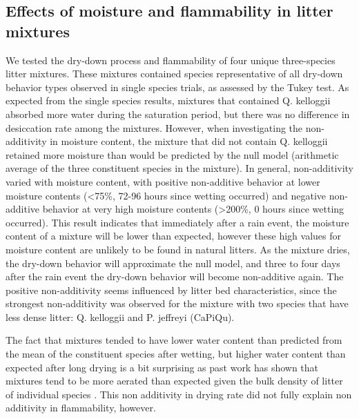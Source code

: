 \documentclass[fire,article,submit,moreauthors,pdftex]{Definitions/mdpi}
\begin{document}
\subsection{Effects of moisture and flammability in litter mixtures}

We tested the dry-down process and flammability of four unique three-species litter mixtures. These mixtures contained species representative of all dry-down behavior types observed in single species trials, as assessed by the Tukey test. As expected from the single species results, mixtures that contained Q. kelloggii absorbed more water during the saturation period, but there was no difference in desiccation rate among the mixtures. However, when investigating the non-additivity in moisture content, the mixture that did not contain Q. kelloggii retained more moisture than would be predicted by the null model (arithmetic average of the three constituent species in the mixture). In general, non-additivity varied with moisture content, with positive non-additive behavior at lower moisture contents (<75\%, 72-96 hours since wetting occurred) and negative non-additive behavior at very high moisture contents (>200\%, 0 hours since wetting occurred). This result indicates that immediately after a rain event, the moisture content of a mixture will be lower than expected, however these high values for moisture content are unlikely to be found in natural litters. As the mixture dries, the dry-down behavior will approximate the null model, and three to four days after the rain event the dry-down behavior will become non-additive again. The positive non-additivity seems influenced by litter bed characteristics, since the strongest non-additivity was observed for the mixture with two species that have less dense litter: Q. kelloggii and P. jeffreyi (CaPiQu).


The fact that mixtures tended to have lower water content than predicted from
the mean of the constituent species after wetting, but higher water content
than expected after long drying is a bit surprising as past work has shown that
mixtures tend to be more aerated than expected given the bulk density of litter
of individual species \citep{Magalhaes+Schwilk-2012}. This non additivity in
drying rate did not fully explain non additivity in flammability, however.
\end{document}
